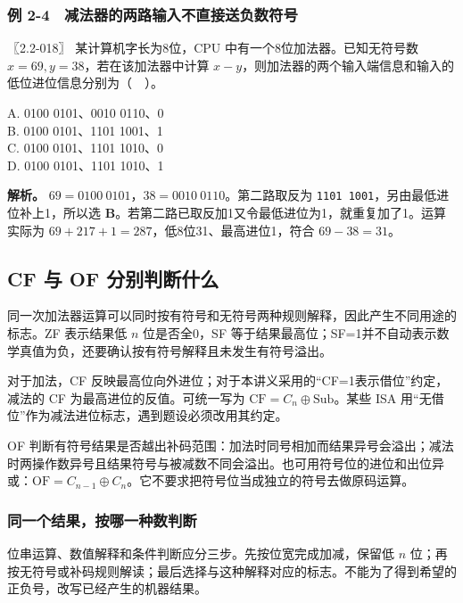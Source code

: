 \subsubsection{例 2-4　减法器的两路输入不直接送负数符号}\label{co-ex2-4}

\noindent{}〖2.2-018〗 某计算机字长为8位，CPU 中有一个8位加法器。已知无符号数 \(x=69,y=38\)，若在该加法器中计算 \(x-y\)，则加法器的两个输入端信息和输入的低位进位信息分别为（　）。

A. 0100 0101、0010 0110、0\\
B. 0100 0101、1101 1001、1\\
C. 0100 0101、1101 1010、0\\
D. 0100 0101、1101 1010、1


\textbf{解析。} \(69=0100\ 0101\)，\(38=0010\ 0110\)。第二路取反为 \texttt{1101\ 1001}，另由最低进位补上1，所以选 \textbf{B}。若第二路已取反加1又令最低进位为1，就重复加了1。运算实际为 \(69+217+1=287\)，低8位31、最高进位1，符合 \(69-38=31\)。

\subsection{CF 与 OF 分别判断什么}\label{co-02-05}

同一次加法器运算可以同时按有符号和无符号两种规则解释，因此产生不同用途的标志。ZF 表示结果低 \(n\) 位是否全0，SF 等于结果最高位；SF=1并不自动表示数学真值为负，还要确认按有符号解释且未发生有符号溢出。

对于加法，CF 反映最高位向外进位；对于本讲义采用的``CF=1表示借位''约定，减法的 CF 为最高进位的反值。可统一写为 \(\mathrm{CF}=C_n\oplus\mathrm{Sub}\)。某些 ISA 用``无借位''作为减法进位标志，遇到题设必须改用其约定。

OF 判断有符号结果是否越出补码范围：加法时同号相加而结果异号会溢出；减法时两操作数异号且结果符号与被减数不同会溢出。也可用符号位的进位和出位异或：\(\mathrm{OF}=C_{n-1}\oplus C_n\)。它不要求把符号位当成独立的符号去做原码运算。

\subsubsection{同一个结果，按哪一种数判断}\label{ux540cux4e00ux4e2aux7ed3ux679cux6309ux54eaux4e00ux79cdux6570ux5224ux65ad}

位串运算、数值解释和条件判断应分三步。先按位宽完成加减，保留低 \(n\) 位；再按无符号或补码规则解读；最后选择与这种解释对应的标志。不能为了得到希望的正负号，改写已经产生的机器结果。

